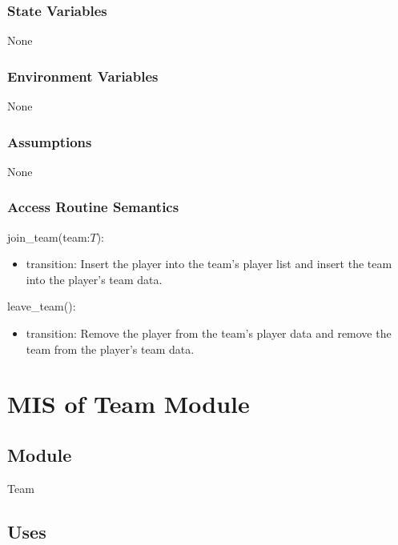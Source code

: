 \documentclass[12pt, titlepage]{article}
\begin{document}
\subsubsection{State Variables}

None

\subsubsection{Environment Variables}

None

\subsubsection{Assumptions}


None

\subsubsection{Access Routine Semantics}

\noindent join\_team(team:$T$):
\begin{itemize}
\item transition: Insert the player into the team's player list and insert the
team into the player's team data.
\end{itemize}

\noindent leave\_team():
\begin{itemize}
\item transition: Remove the player from the team's player data and remove the
team from the player's team data.
\end{itemize}

\newpage

\section{MIS of Team Module} \label{mTE}

\subsection{Module}

Team

\subsection{Uses}
\end{document}
